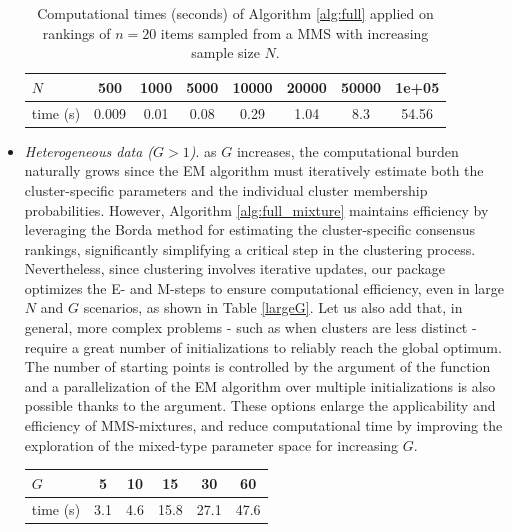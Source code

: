 \begin{itemize}
\begin{table}[h!]
\centering
\begin{tabular}{|llllllll}\hline
$N$ &
  \multicolumn{1}{|c|}{500} &
  \multicolumn{1}{|c|}{1000} &
  \multicolumn{1}{|c|}{5000} &
  \multicolumn{1}{|c|}{10000} &
  \multicolumn{1}{|c|}{20000} &
  \multicolumn{1}{|c|}{50000} &
  \multicolumn{1}{|c|}{1e+05} \\\hline
time (s) &
  \multicolumn{1}{|c|}{0.009} &
  \multicolumn{1}{|c|}{0.01} &
  \multicolumn{1}{|c|}{0.08} &
  \multicolumn{1}{|c|}{0.29} &
  \multicolumn{1}{|c|}{1.04} &
  \multicolumn{1}{|c|}{8.3} &
  \multicolumn{1}{|c|}{54.56} \\\hline
\end{tabular}
\caption{Computational times (seconds) of Algorithm \ref{alg:full} applied on rankings of $n=20$ items sampled from a MMS with increasing sample size $N$.}
\label{largeN}
\end{table}
\item \textit{Heterogeneous data ($G > 1$)}. as $G$ increases, the computational burden naturally grows since the EM algorithm must iteratively estimate both the cluster-specific parameters and the individual cluster membership probabilities.
However, Algorithm \ref{alg:full_mixture} maintains efficiency by leveraging the Borda method for estimating the cluster-specific consensus rankings, significantly simplifying a critical step in the clustering process.
Nevertheless, since clustering involves iterative updates, our package optimizes the E- and M-steps to ensure computational efficiency, even in large $N$ and $G$ scenarios, as shown in Table \ref{largeG}. Let us also add that, in general, more complex problems - such as when clusters are less distinct - require a great number of initializations  to reliably reach the global optimum. The number of starting points is controlled by the argument  of the  function and a parallelization of the EM algorithm over multiple initializations is also possible thanks to the  argument. These options enlarge the applicability and efficiency of MMS-mixtures, and reduce computational time by improving the exploration of the mixed-type parameter space for increasing $G$.
\begin{table}[h]
\centering
\begin{tabular}{|l|c|c|c|c|c|}
\hline
$G$        & 5   & 10  & 15   & 30   & 60   \\ \hline
time (s) & 3.1 & 4.6 & 15.8 & 27.1 & 47.6 \\ \hline

\end{tabular}
\end{table}
\end{itemize}
